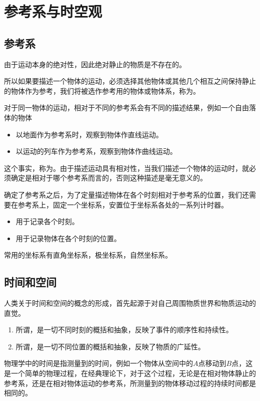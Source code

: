 \section{参考系与时空观}

\subsection{参考系}
由于运动本身的绝对性，因此绝对静止的物质是不存在的。

所以如果要描述一个物体的运动，必须选择其他物体或其他几个相互之间保持静止的物体作为参考，我们将被选作参考用的物体或物体系，称为。

对于同一物体的运动，相对于不同的参考系会有不同的描述结果，例如一个自由落体的物体
\begin{itemize}
    \item 以地面作为参考系时，观察到物体作直线运动。
    \item 以运动的列车作为参考系，观察到物体作曲线运动。
\end{itemize}
这个事实，称为。由于描述运动具有相对性，当我们描述一个物体的运动时，就必须确定是相对于哪个参考系而言的，否则这种描述是毫无意义的。

确定了参考系之后，为了定量描述物体在各个时刻相对于参考系的位置，我们还需要在参考系上，固定一个坐标系，安置位于坐标系各处的一系列计时器。
\begin{itemize}
    \item {}用于记录各个时刻。
    \item {}用于记录物体在各个时刻的位置。
\end{itemize}
常用的坐标系有直角坐标系，极坐标系，自然坐标系。

\subsection{时间和空间}
人类关于时间和空间的概念的形成，首先起源于对自己周围物质世界和物质运动的直觉。
\begin{enumerate}
    \item 所谓，是一切不同时刻的概括和抽象，反映了事件的顺序性和持续性。
    \item 所谓，是一切不同位置的概括和抽象，反映了物质的广延性。
\end{enumerate}
物理学中的时间是指测量到的时间，例如一个物体从空间中的$A$点移动到$B$点，这是一个简单的物理过程，在经典理论下，对于这个过程，无论是在相对物体静止的参考系，还是在相对物体运动的参考系，所测量到的物体移动过程的持续时间都是相同的。

